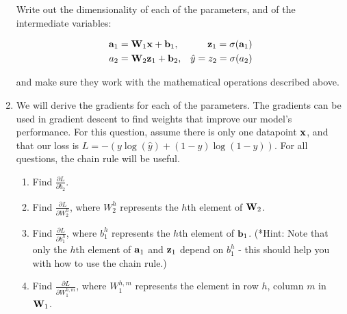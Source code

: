 \documentclass[submit]{harvardml}
\begin{document}
\begin{problem}
\begin{enumerate}
      Write out the dimensionality of each of the parameters, and of the intermediate variables:

          \begin{align*}
          \bold{a}_1 &= \bold{W}_1 \bold{x} + \bold{b}_1, 
          &\bold{z}_1 = \sigma(\bold{a}_1) \\
          a_2 &= \bold{W}_2 \bold{z}_1 + \bold{b}_2, 
          &\hat{y} = z_2 = \sigma(a_2)
          \end{align*}
          
      and make sure they work with the mathematical operations described above.
      
    \item  We will derive the gradients for each of the parameters.  The gradients can be used in gradient descent to find weights that improve our model's performance. For this question, assume there is only one datapoint $\bold{x}$, and that our loss is $L = -(y \log (\hat{y}) + (1 - y) \log (1 - \hat{y}))$. For all questions, the chain rule will be useful.
    \begin{enumerate}
        \item Find $\frac{\partial L}{\partial b_2}$. 
        
        \item Find $\frac{\partial L}{\partial W_2^h}$, where $W_2^h$ represents the $h$th element of $\bold{W}_2$.
        
        \item Find $\frac{\partial L}{\partial b_1^h}$, where $b_1^h$ represents the $h$th element of $\bold{b}_1$. (*Hint: Note that only the $h$th element of $\bold{a}_1$ and $\bold{z}_1$ depend on $b_1^h$ - this should help you with how to use the chain rule.)
        
        \item Find $\frac{\partial L}{\partial W_1^{h,m}}$, where  $W_1^{h,m}$ represents the element in row $h$, column $m$ in $\bold{W}_1$.
    
    \end{enumerate}
    \end{enumerate}
    
    \end{problem}
\end{document}
